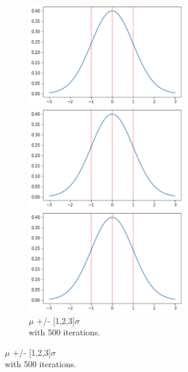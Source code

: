 \documentclass[12pt]{article}
\begin{document}
\noindent
\begin{figure}[b]
\centering
\begin{subfigure}{.32\textwidth}
    \centering
    \includegraphics[width=0.75\textwidth]{sd_3.png}
    \caption[short]{$\mu$ +/- [1]$\sigma$ \\with 500 iterations.}
    \includegraphics[width=0.75\textwidth]{sd_3.png}
    \caption[short]{$\mu$ +/- [1,2]$\sigma$ \\with 500 iterations.}
    \includegraphics[width=0.75\textwidth]{sd_3.png}
    \caption[short]{$\mu$ +/- [1,2,3]$\sigma$ \\with 500 iterations.}
\end{subfigure}

\end{figure}
\end{document}

